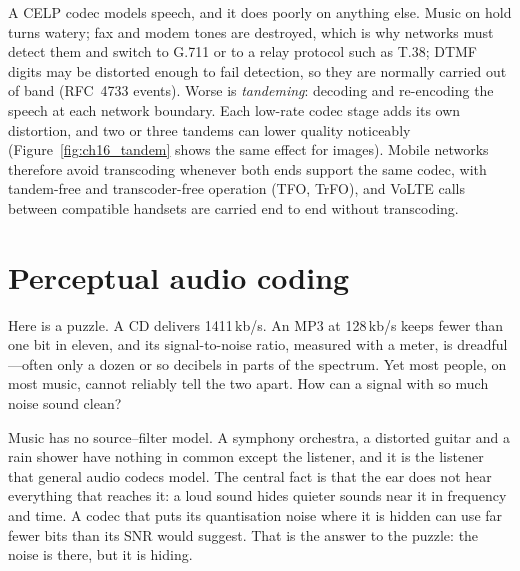 \begin{pitfall}
A CELP codec models speech, and it does poorly on anything else. Music on hold turns watery;
fax and modem tones are destroyed, which is why networks must detect them and switch to G.711 or to a
relay protocol such as T.38; DTMF digits may be distorted enough to fail detection, so they are
normally carried out of band (RFC~4733 events). Worse is \emph{tandeming}: decoding and re-encoding the
speech at each network boundary. Each low-rate codec stage adds its own distortion, and two or three
tandems can lower quality noticeably (Figure~\ref{fig:ch16_tandem} shows the same effect for images).
Mobile networks therefore avoid transcoding whenever both ends support the same codec, with
tandem-free and transcoder-free operation (TFO, TrFO), and VoLTE calls between compatible handsets are
carried end to end without transcoding.
\end{pitfall}


\section{Perceptual audio coding}
\label{sec:ch16:audio}

Here is a puzzle. A CD delivers 1411\,kb/s. An MP3 at 128\,kb/s keeps fewer than one bit in eleven,
and its signal-to-noise ratio, measured with a meter, is dreadful---often only a dozen or so
decibels in parts of the spectrum. Yet most people, on most music, cannot reliably tell the two
apart. How can a signal with so much noise sound clean?

Music has no source--filter model. A symphony orchestra, a distorted guitar and a rain shower have
nothing in common except the listener, and it is the listener that general audio codecs model. The
central fact is that the ear does not hear everything that reaches it: a loud sound hides quieter
sounds near it in frequency and time. A codec that puts its quantisation noise where it is hidden
can use far fewer bits than its SNR would suggest. That is the answer to the puzzle: the noise is
there, but it is hiding.

